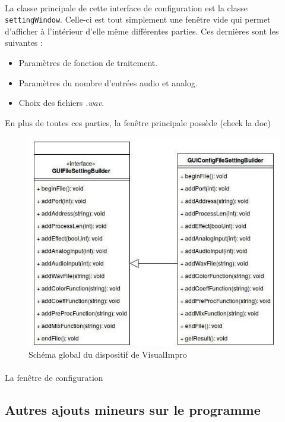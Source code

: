 \paragraph{}
La classe principale de cette interface de configuration est la
classe \verb!settingWindow!. Celle-ci est tout simplement une fenêtre vide
qui permet d'afficher à l'intérieur d'elle même différentes parties.
Ces dernières sont les suivantes :
\begin{itemize}
 \item Paramètres de fonction de traitement.
 \item Paramètres du nombre d'entrées audio et analog.
 \item Choix des fichiers \textit{.wav}.
\end{itemize}
En plus de toutes ces parties, la fenêtre principale possède (check la doc)

\begin{figure}[h]
 \centering
 \includegraphics[scale=0.5]{umlBuilder.png}
 \caption{Schéma global du dispositif de VisualImpro}
 \label{schéma global}
\end{figure}

\paragraph{}
La fenêtre de configuration

\subsection{Autres ajouts mineurs sur le programme}
